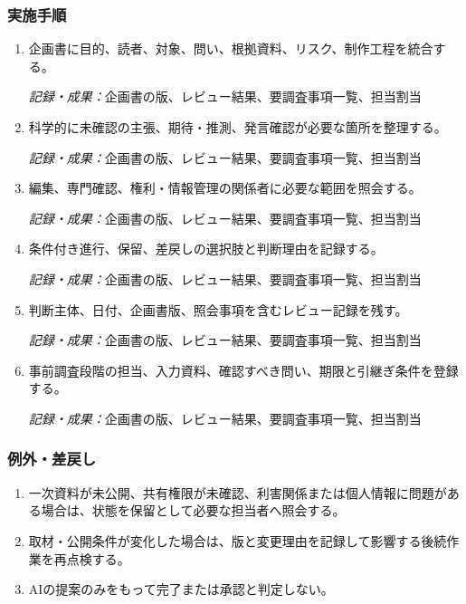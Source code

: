 \documentclass[a4paper,11pt]{article}
\begin{document}
\subsubsection*{実施手順}
\begin{enumerate}[leftmargin=2em,itemsep=0.65em]
\item 企画書に目的、読者、対象、問い、根拠資料、リスク、制作工程を統合する。\par\noindent\textit{記録・成果：}企画書の版、レビュー結果、要調査事項一覧、担当割当\nobreak\smallskip
\item 科学的に未確認の主張、期待・推測、発言確認が必要な箇所を整理する。\par\noindent\textit{記録・成果：}企画書の版、レビュー結果、要調査事項一覧、担当割当\nobreak\smallskip
\item 編集、専門確認、権利・情報管理の関係者に必要な範囲を照会する。\par\noindent\textit{記録・成果：}企画書の版、レビュー結果、要調査事項一覧、担当割当\nobreak\smallskip
\item 条件付き進行、保留、差戻しの選択肢と判断理由を記録する。\par\noindent\textit{記録・成果：}企画書の版、レビュー結果、要調査事項一覧、担当割当\nobreak\smallskip
\item 判断主体、日付、企画書版、照会事項を含むレビュー記録を残す。\par\noindent\textit{記録・成果：}企画書の版、レビュー結果、要調査事項一覧、担当割当\nobreak\smallskip
\item 事前調査段階の担当、入力資料、確認すべき問い、期限と引継ぎ条件を登録する。\par\noindent\textit{記録・成果：}企画書の版、レビュー結果、要調査事項一覧、担当割当\nobreak\smallskip
\end{enumerate}
\subsubsection*{例外・差戻し}
\begin{enumerate}[leftmargin=2em,itemsep=0.35em]
\item 一次資料が未公開、共有権限が未確認、利害関係または個人情報に問題がある場合は、状態を保留として必要な担当者へ照会する。
\item 取材・公開条件が変化した場合は、版と変更理由を記録して影響する後続作業を再点検する。
\item AIの提案のみをもって完了または承認と判定しない。
\end{enumerate}
\end{document}
